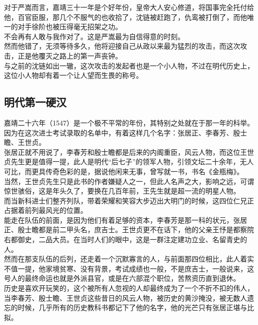 \begin{multicols}{\theparacolNo}
对于严嵩而言，嘉靖三十一年是个好年份，皇帝大人安心修道，将国事完全托付给他，百官臣服，那几个不服气的也收拾了，沈链被赶跑了，仇鸾被打倒了，而他唯一的对手徐阶也被压得毫无招架之功。\\

不会再有人敢与我作对了。这是严嵩最为自信得意的时刻。\\

然而他错了，无须等待多久，他将迎接自己从政以来最为猛烈的攻击，而这次攻击，正是他覆灭之路上的第一声丧钟。\\

与之前的沈链如出一辙，这次攻击的发起者也是一个小人物，不过在明代历史上，这位小人物却有着一个让人望而生畏的称号。\\

\subsection{明代第一硬汉}
嘉靖二十六年（1547）是一个极不平常的年份，其特别之处就在于那一年的科举。\\

因为在这次进士考试录取的名单中，有着这样几个名字：张居正、李春芳、殷士瞻、王世贞。\\

张居正就不用说了，李春芳和殷士瞻都是后来的内阁重臣，风云人物，而这位王世贞先生更是值得一提，此人是明代“后七子”的领军人物，引领文坛二十余年，无人可比，而更具传奇色彩的是，据说他闲来无事，曾写就一书，书名《金瓶梅》。\\

当然，王世贞先生只是此书的作者嫌疑人之一，但此人名声之大，影响之远，可谓惊世骇俗，这是年头久了，要换在几百年前，王先生就是超一流的明星人物。\\

而当新科进士们整齐列队，带着荣耀和笑容大步迈出大明门的时候，这四位仁兄正占据着前列最风光的位置。\\

能走在队伍的前面，是因为他们有着足够的资本，李春芳是那一科的状元，张居正、殷士瞻都是前二甲头名，庶吉士。王世贞更不在话下，他的父亲王忬是都察院右都御史，二品大员。在当时人们的眼中，这是一群注定建功立业、名留青史的人。\\

然而在那支队伍的后列，还走着一个沉默寡言的人，与前面那四位相比，此人着实不值一提，他家境贫寒、没有背景，考试成绩也一般，不是庶吉士，一般说来，这号人的最终命运也就是外派县官，或是在六部混个职位，苦熬资历直到退休。\\

历史是喜欢开玩笑的，这个被所有人忽视的人却最终成为了一个不折不扣的伟人，当李春芳、殷士瞻、王世贞这些昔日的风云人物，被历史的黄沙掩没，被无数人遗忘的时候，几乎所有的历史教科书都记下了他的名字，他的光芒只有张居正堪与比拟。\\


\end{multicols}
